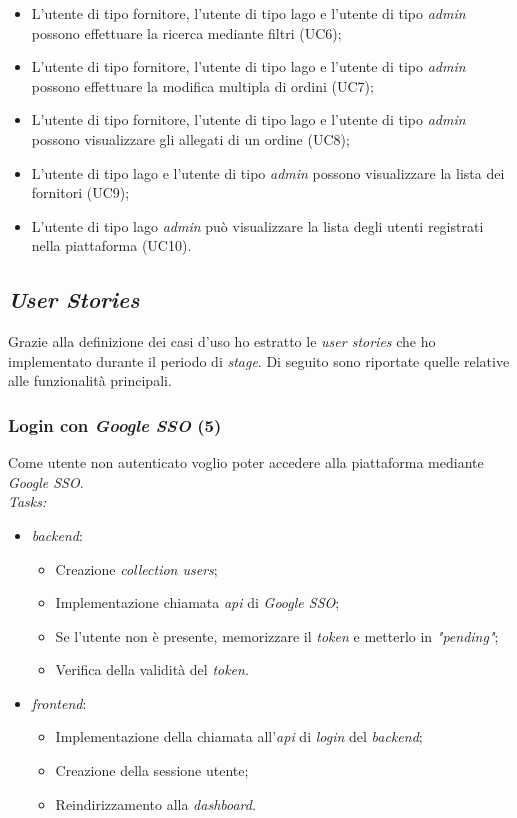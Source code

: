 \begin{itemize}
\begin{itemize}
      \item L'utente di tipo fornitore, l'utente di tipo lago e l'utente di tipo \emph{admin} possono effettuare la ricerca mediante filtri (UC6);
      \item L'utente di tipo fornitore, l'utente di tipo lago e l'utente di tipo \emph{admin} possono effettuare la modifica multipla di ordini (UC7);
      \item L'utente di tipo fornitore, l'utente di tipo lago e l'utente di tipo \emph{admin} possono visualizzare gli allegati di un ordine (UC8);
      \item L'utente di tipo lago e l'utente di tipo \emph{admin} possono visualizzare la lista dei fornitori (UC9);
      \item L'utente di tipo lago \emph{admin} può visualizzare la lista degli utenti registrati nella piattaforma (UC10).
    \end{itemize}
\end{itemize}

\subsection{\emph{User Stories}}
Grazie alla definizione dei casi d'uso ho estratto le \emph{user stories} che ho implementato durante il periodo di \emph{stage}. Di seguito sono riportate quelle relative alle funzionalità principali.

\subsubsection{Login con \emph{Google SSO} (5)}
Come utente non autenticato voglio poter accedere alla piattaforma mediante \emph{Google SSO}. \\
\emph{Tasks:}
\begin{itemize}
  \item \emph{\Gls{backend}}:
    \begin{itemize}
      \item Creazione \emph{collection users};
      \item Implementazione chiamata \emph{\acrshort{api}} di \emph{Google SSO};
      \item Se l'utente non è presente, memorizzare il \emph{token} e metterlo in \emph{"pending"};
      \item Verifica della validità del \emph{token}.
    \end{itemize}
  \item \emph{\Gls{frontend}}:
    \begin{itemize}
      \item Implementazione della chiamata all'\emph{\acrshort{api}} di \emph{login} del \emph{\gls{backend}};
      \item Creazione della sessione utente;
      \item Reindirizzamento alla \emph{dashboard}.
    \end{itemize}
\end{itemize}

